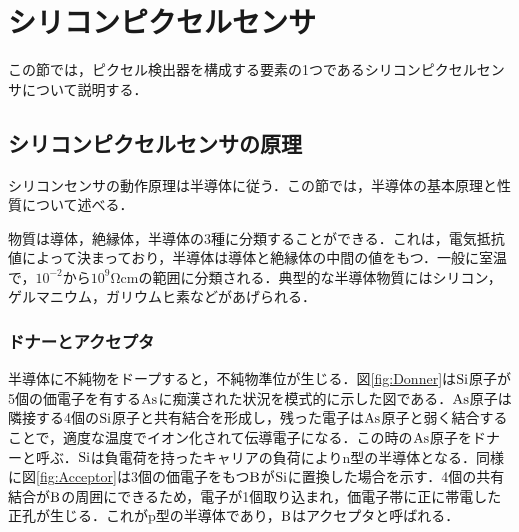 \section{シリコンピクセルセンサ}
\label{sec:sensor}
この節では，ピクセル検出器を構成する要素の1つであるシリコンピクセルセンサについて説明する．

\subsection{シリコンピクセルセンサの原理}
シリコンセンサの動作原理は半導体に従う．この節では，半導体の基本原理と性質について述べる．\par
物質は導体，絶縁体，半導体の3種に分類することができる．これは，電気抵抗値によって決まっており，半導体は導体と絶縁体の中間の値をもつ．一般に室温で，$10^{-2}$から$10^9 \mathrm{\Omega cm}$の範囲に分類される．典型的な半導体物質にはシリコン，ゲルマニウム，ガリウムヒ素などがあげられる．

\subsubsection*{ドナーとアクセプタ}
半導体に不純物をドープすると，不純物準位が生じる．図\ref{fig:Donner}は$\ce{Si}$原子が5個の価電子を有する$\ce{As}$に痴漢された状況を模式的に示した図である．$\ce{As}$原子は隣接する4個の$\ce{Si}$原子と共有結合を形成し，残った電子は$\ce{As}$原子と弱く結合することで，適度な温度でイオン化されて伝導電子になる．この時の$\ce{As}$原子をドナーと呼ぶ．$\ce{Si}$は負電荷を持ったキャリアの負荷によりn型の半導体となる．同様に図\ref{fig:Acceptor}は3個の価電子をもつ$\ce{B}$が$\ce{Si}$に置換した場合を示す．4個の共有結合が$\ce{B}$の周囲にできるため，電子が1個取り込まれ，価電子帯に正に帯電した正孔が生じる．これがp型の半導体であり，$\ce{B}$はアクセプタと呼ばれる．

